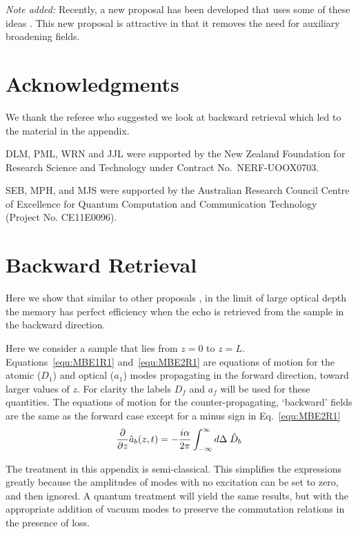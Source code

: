                                                                                                                                                                                                                                                                                                                                                                                                                                                                                                                                                                                                                                                                                                                                                                                                                                                                                                                                                                                                                                                                                                                                                                                                                                                                                                                                                                                                                                                                                                                                                                                                                                                                                                                                                                                                                                                                                                                                                                                                                                                                                                                                                                                                                                                                                                                                                                                                                                                                                                                                                                                                                                                                                                                                                                                                                                                                                                                                                                                                                                                                                                                                                                                                                                                                                                                                                                                                                                                                                                                                                                                                                                                                                                                                                                                                                                                                                                                                                                                                                                                                                                                                                                                                                                                                                                                                                                                                                                                                                                                                                                                                                                                                                                                                                                                                                                                                                                                                                                                                                                                                                                                                                                                                                                                                                                                                                                                                                                                                                                                                                                                                                                                                                                                                                                                                                                                                                                                                                                                                                                                                                                                                                                                                                                                                                                                                                                                                                                                                                                                                                                                                                                                                                                                                                                                                                                                                                                                                                                                                                                                                                                                                                                                                                                                                                                                                                                                                                                                                                                                                                                                                                                                                                                                                                                                                                                                                                                                                                                                                                                                                                                                                                                                                                                                                                                                                                                                                                                                                                                                                                                                                                                                                                                                                                                                                                                                                                                                                                                                                                                                                                                                                                                                                                                                                                                                                                                                                                                                                                                                                                                                                                                                                                                                                                                                                                                                                                                                                                                                                                                                                                                                                                                                                                                                                                                                                                                                                                                                                                                                                                                                                                                                                                                                                                                                                                                                                                                                                                                                                                                                                                                                                                                                                                                                                                                                                                                                                                                                                                                                                                                                                                                                                                                                                                                                                                                                                                                                                                                                                                                                                                                                                                                                                                                                                                                                                                                                                                                                                                                                                                                                                                                                                                                                                                                                                                                                                                                                                                                                                                                                                                                                                                                                                                                                                                                                                                                                                                                                                                                                                                                                                                                                                                                                                                                                                                                                                                                                                                                                                                                                                                                                                                                                                                                                                                                                                                                                                                                                                                                                                                                                                                                                                                                                                                                                                                                                                                                                                                                                                                                                                                                                                                                                                                                                                                                                                                                                                                                                                                                                                                                                                                                                                                                                                                                                                                                                                                                                                                                                                                                                                                                                                                                                                                                                                                                                                                                                                                                                                                                                                                                                                                                                                                                                                                                                                                                                                                                                                                                                                                                                                                                                                                                                                                                                                                                                                                                                                                                                                                                                                                                                                                                                                                                                                                                                                                                                                                                                                                                                                                                                                                                                                                                                                                                                                                                                                                                                                                                                                                                                                                                                                                                                                                                                                                                                                                                                                                                                                                                                                                                                                                                                                                                                                                                                                                                                                                                                                                                                                                                                                                                                                                                                                                                                                                                                                                                                                                                                                                                                                                                                                                                                                                                                                                                                                                                                                                                                                                                                                                                                                                                                                                                                                                                                                                                                                                                                                                                                                                                                                                                                                                                                                                                                                                                                                                                                                                                                                                                                                                                                                                                                                                                                                                                                                                                                                                                                                                                                                                                                                                                                                                                                                                                                                                                                                                                                                                                                                                                                                                                                                                                                                                                                                                                                                                                                                                                                                                                                                                                                                                                                                                                                                                                                                                                                                                                                                                                                                                                                                                                                                                                                                                                                                                                                                                                                                                                                                                                                                                                                                                                                                                                                                                                                                                                                                                                                                                                                                                                                                                                                                                                                                                                                                                                                                                                                                                                                                                                                                                                                                                                                                                                                                                                                                                                                                                                                                                                                                                                                                                                                                                                                                                                                                                                                                                                                                                                                                                                                                                                                                                                                                                                                                                                                                                                                                                                                                                                                                                                                                                                                                                                                                                                                                                                                                                                                                                                                                                                                                                                                                                                                                                                                                                                                                                                                                                                                                                                                                                                                                                                                                                                                                                                                                                                                                                                                                                                                                                                                                                                                                                                                                                                                                                                                                                                                                                                                                                                                                                                                                                                                                                                                                                                                                                                                                                                                                                                                                                                                                                                                                                                                                                                                                                                                                                                                                                                                                                                                                                                                                                                                                                                                                                                                                                                                                                                                                                                                                                                                                                                                                                                                                                                                                                                                                                                                                                                                                                                                                                                                                                                                                                                                                                                                                                                                                                                                                                                                                                                                                                                                                                                                                                                                                                                                                                                                                                                                                                                                                                                                                                                                                                                                                                                                                                                                                                                                                                                                                                                                                                                                                                                                                                                                                                                                                                                                                                                                                                                                                                                                                                                                                                                                                                                                                                                                                                                                                                                                                                                                                                                                                                                                                                                                                                                                                                                                                                                                                                                                                                                                                                                                                                                                                                                                                                                                                                                                                                                                                                                                                                                                                                                                                                                                                                                                                                                                                                                                                                                                                                                                                                                                                                                                                                                                                                                                                                                                                                                                                                                                                                                                                                                                                                                                                                                                                                                                                                                                                                                                                                                                                                                                                                                                                                                                                                                                                                                                                                                                                                                                                                                                                                                                                                                                                                                                                                                                                                                                                                                                                                                                                                                                                                                                                                                                                                                                                                                                                                                                                                                                                                                                                                                                                                                                                                                                                                                                                                                                                                                                                                                                                                                                                                                                                                                                                                                                                                                                                                                                                                                                                                                                                                                                                                                                                                                                                                                                                                                                                                                                                                                                                                                                                                                                                                                                                                                                                                                                                                                                                                                                                                                                                                                                                                                                                                                                                                                                                                                                                                                                                                                                                                                                                                                                                                                                                                                                                                                                                                                                                                                                                                                                                                                                                                                                                                                                                                                                                                                                                                                                                                                                                                                                                                                                                                                                                                                                                                                                                                                                                                                                                                                                                                                                                                                                                                                                                                                                                                                                                                                                                                                                                                                                                                                                                                                                                                                                                                                                                                                                                                                                                                                                                                                                                                                                                                                                                                                                                                                                                                                                                                                                                                                                                                                                                                                                                                                                                                                                                                                                                                                                                                                                                                                                                                                                                                                                                                                                                                                                                                                                                                                                                                                                                                                                                                                                                                                                                                                                                                                                                                                                                                                                                                                                                                                                                                                                                                                                                                                                                                                                                                                                                                                                                                                                                                                                                                                                                                                                                                                                                                                                                                                                                                                                                                                                                                                                                                                                                                                                                                                                                                                                                                                                                                                                                                                                                                                                                                                                                                                                                                                                                                                                                                                                                                                                                                                                                                                                                                                                                                                                                                                                                                                                                                                                                                                                                                                                                                                                                                                                                                                                                                                                                                                                                                                                                                                                                                                                                                                                                                                                                                                                                                                                                                                                                                                                                                                                                                                                                                                                                                                                                                                                                                                                                                                                                                                                                                                                                                                                                                                                                                                                                                                                                                                                                                                                                                                                                                                                                                                                                                                                                                                                                                                                                                                                                                                                                                                                                                                                                                                                                                                                                                                                                                                                                                                                                                                                                                                                                                                                                                                                                                                                                                                                                                                                                                                                                                                                                                                                                                                                                                                                                                                                                                                                                                                                                                                                                                                                                                                                                                                                                                                                                                                                                                                                                                                                                                                                                                                                                                                                                                                                                                                                                                                                                                                                                                                                                                                                                                                                                                                                                                                                    \documentclass[superscriptaddress,pra,twocolumn,showpacs,amsmath,amssymb,aps,a4paper]{revtex4}
\begin{document}
\textit{Note added:} Recently, a new proposal has been developed that uses some of these ideas \cite{rose}. This new proposal is attractive in that it removes the need for auxiliary broadening fields.


\section{Acknowledgments}

We thank the referee who suggested we look at backward retrieval which led to the material in the appendix.

DLM, PML, WRN and JJL were supported by the New Zealand Foundation for Research Science and Technology under Contract No.\ NERF-UOOX0703.

SEB, MPH, and MJS were supported by the Australian Research Council Centre of Excellence for Quantum Computation and Communication Technology (Project No. CE11E0096).


\appendix*

\section{Backward Retrieval}

Here we show that similar to other proposals \cite{mois01,afze09,rose}, in the limit of large optical depth the memory has perfect efficiency when the echo is retrieved from the sample in the backward direction.

Here we consider a sample that lies from $z=0$ to $z=L$. Equations~\ref{equ:MBE1R1} and~\ref{equ:MBE2R1} are equations of motion for the atomic ($D_1$) and optical ($a_1$) modes propagating in the forward direction, toward larger values of $z$. For clarity the labels $D_f$  and $a_f$ will be used for these quantities. The equations of motion for the counter-propagating, `backward' fields are the same as the forward case except for a minus sign in Eq.~\ref{equ:MBE2R1}
\begin{equation}
    \frac{\partial}{\partial z}  \hat{a}_{b}(z,t) = {\bf -}\frac{i \alpha}{2 \pi} \int_{-\infty}^{\infty} d\Delta \;   \hat{D}_{b}
\end{equation}

The treatment in this appendix is semi-classical. This simplifies the expressions greatly because the amplitudes of modes with no excitation can be set to zero, and then ignored. A quantum treatment will yield the same results, but with the appropriate addition of vacuum modes to preserve the commutation relations in the presence of loss.
\end{document}
